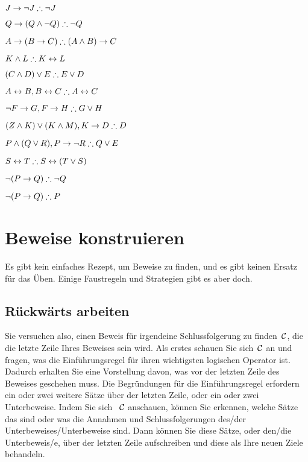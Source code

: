 \begin{earg}
\item $J\eif\enot J \therefore \enot J$
\item $Q\eif(Q\eand\enot Q) \therefore \enot Q$
\item $A\eif (B\eif C) \therefore (A\eand B)\eif C$
\item $K\eand L \therefore K\eiff L$
\item $(C\eand D)\eor E \therefore E\eor D$
\item $A\eiff B, B\eiff C \therefore A\eiff C$
\item $\enot F\eif G, F\eif H \therefore G\eor H$
\item $(Z\eand K) \eor (K\eand M), K \eif D \therefore D$
\item $P \eand (Q\eor R), P\eif \enot R \therefore Q\eor E$
\item $S\eiff T \therefore S\eiff (T\eor S)$
\item $\enot (P \eif Q) \therefore \enot Q$
\item $\enot (P \eif Q) \therefore P$
\end{earg}


\chapter{Beweise konstruieren}\label{s:stratTFL}

Es gibt kein einfaches Rezept, um Beweise zu finden, und es gibt keinen Ersatz für das Üben. Einige Faustregeln und Strategien gibt es aber doch.

\section{Rückwärts arbeiten}

Sie versuchen also, einen Beweis für irgendeine Schlussfolgerung zu finden~$\mathcal{C}$, die die letzte Zeile Ihres Beweises sein wird. Als erstes schauen Sie sich~$\mathcal{C}$ an und fragen, was die Einführungsregel für ihren wichtigsten logischen Operator ist. Dadurch erhalten Sie eine Vorstellung davon, was vor der letzten Zeile des Beweises geschehen muss. Die Begründungen für die Einführungsregel erfordern ein oder zwei weitere Sätze über der letzten Zeile, oder ein oder zwei Unterbeweise. Indem Sie sich ~$\mathcal{C}$ anschauen, können Sie erkennen, welche Sätze das sind oder was die Annahmen und Schlussfolgerungen des/der Unterbeweises/Unterbeweise sind. Dann können Sie diese Sätze, oder den/die Unterbeweis/e, über der letzten Zeile aufschreiben und diese als Ihre neuen Ziele behandeln.

